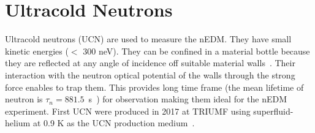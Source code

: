 



\section{Ultracold Neutrons}
Ultracold neutrons (UCN) are used to measure the nEDM. They have small kinetic energies ($<$ 300 neV).  They can be confined in a material bottle because they are reflected at any angle of incidence off suitable material walls~\cite{ucn_storage}. Their interaction with the neutron optical potential of the walls through the strong force enables to trap them. This provides long time frame (the mean lifetime of neutron is $\tau_n=881.5$~s~\cite{mike}) for observation making them ideal for the nEDM experiment. First UCN were produced in 2017 at TRIUMF using superfluid-helium at 0.9 K as the UCN production medium~\cite{TRIUMF_UCN,taraneh_theis}.

